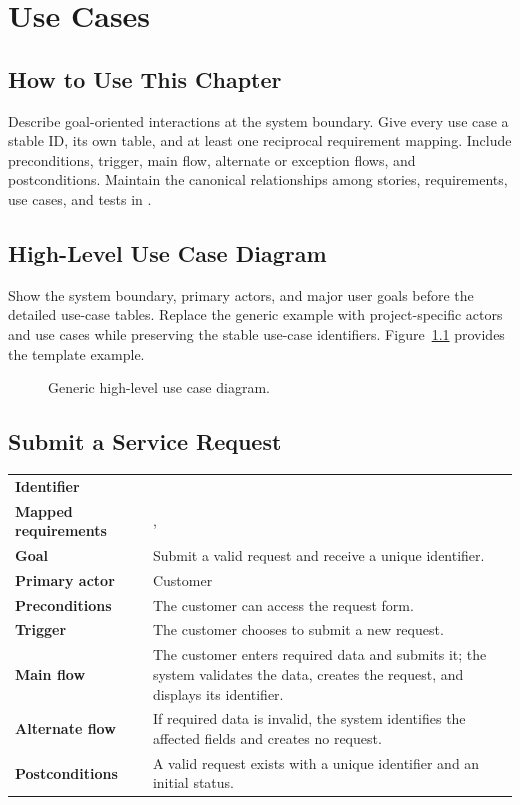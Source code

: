 \chapter{Use Cases}
\section{How to Use This Chapter}
Describe goal-oriented interactions at the system boundary. Give every use case
a stable ID, its own table, and at least one reciprocal requirement mapping.
Include preconditions, trigger, main flow, alternate or exception flows, and
postconditions. Maintain the canonical relationships among stories,
requirements, use cases, and tests in .

\section[High-Level Use Case Diagram]{\hspace{0.5em}High-Level Use Case Diagram}
Show the system boundary, primary actors, and major user goals before the
detailed use-case tables. Replace the generic example with project-specific
actors and use cases while preserving the stable use-case identifiers.
Figure~\ref{Figure:UseCaseDiagram} provides the template example.

\begin{figure}[htbp]
\centering

\caption{Generic high-level use case diagram.}
\label{Figure:UseCaseDiagram}
\end{figure}

\section{Submit a Service Request}
\begin{tabularx}{\linewidth}{L{3.5cm}Y}
\toprule
\textbf{Identifier} & \\
\textbf{Mapped requirements} & , \\
\textbf{Goal} & Submit a valid request and receive a unique identifier.\\
\textbf{Primary actor} & Customer\\
\textbf{Preconditions} & The customer can access the request form.\\
\textbf{Trigger} & The customer chooses to submit a new request.\\
\textbf{Main flow} & The customer enters required data and submits it; the system validates the data, creates the request, and displays its identifier.\\
\textbf{Alternate flow} & If required data is invalid, the system identifies the affected fields and creates no request.\\
\textbf{Postconditions} & A valid request exists with a unique identifier and an initial status.\\
\bottomrule
\end{tabularx}

